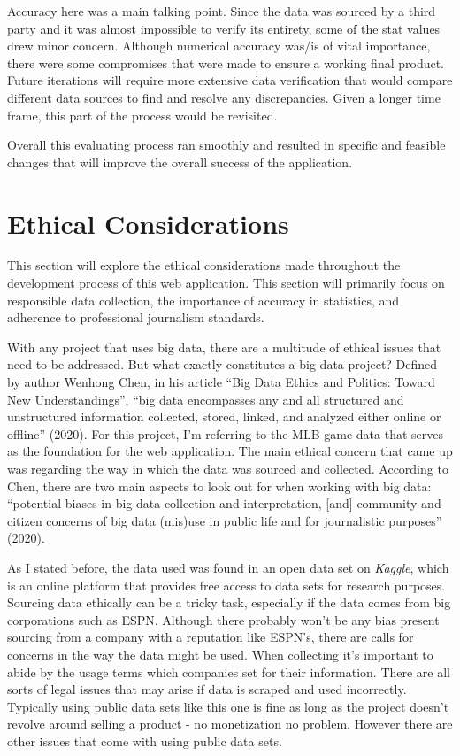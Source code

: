 \documentclass[10pt,twocolumn]{article}
\begin{document}
Accuracy here was a main talking point. Since the data was sourced by a third party and it was almost impossible to verify its entirety, some of the stat values drew minor concern. Although numerical accuracy was/is of vital importance, there were some compromises that were made to ensure a working final product. Future iterations will require more extensive data verification that would compare different data sources to find and resolve any discrepancies. Given a longer time frame, this part of the process would be revisited.

Overall this evaluating process ran smoothly and resulted in specific and feasible changes that will improve the overall success of the application. 


\section{Ethical Considerations}

This section will explore the ethical considerations made throughout the development process of this web application. This section will primarily focus on responsible data collection, the importance of accuracy in statistics, and adherence to professional journalism standards. 

With any project that uses big data, there are a multitude of ethical issues that need to be addressed. But what exactly constitutes a big data project? Defined by author Wenhong Chen, in his article “Big Data Ethics and Politics: Toward New Understandings”, “big data encompasses any and all structured and unstructured information collected, stored, linked, and analyzed either online or offline” (2020). \cite{chen2020} For this project, I'm referring to the MLB game data that serves as the foundation for the web application. The main ethical concern that came up was regarding the way in which the data was sourced and collected. According to Chen, there are two main aspects to look out for when working with big data: “potential biases in big data collection and interpretation, [and] community and citizen concerns of big data (mis)use in public life and for journalistic purposes” (2020). 

As I stated before, the data used was found in an open data set on \textit{Kaggle}, which is an online platform that provides free access to data sets for research purposes. Sourcing data ethically can be a tricky task, especially if the data comes from big corporations such as ESPN. Although there probably won't be any bias present sourcing from a company with a reputation like ESPN’s, there are calls for concerns in the way the data might be used. When collecting it's important to abide by the usage terms which companies set for their information. There are all sorts of legal issues that may arise if data is scraped and used incorrectly. Typically using public data sets like this one is fine as long as the project doesn't revolve around selling a product - no monetization no problem.  However there are other issues that come with using public data sets. 
\end{document}
